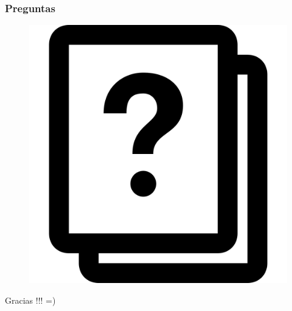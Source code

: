 \documentclass{beamer}
\begin{document}
\begin{frame}
\frametitle{Preguntas}
\begin{figure}
\includegraphics[width=0.4\linewidth]{preguntas.png}
\end{figure}
\end{frame}
\begin{frame}
\Huge{\centerline{Gracias !!! =)}}
\end{frame}
\end{document}
